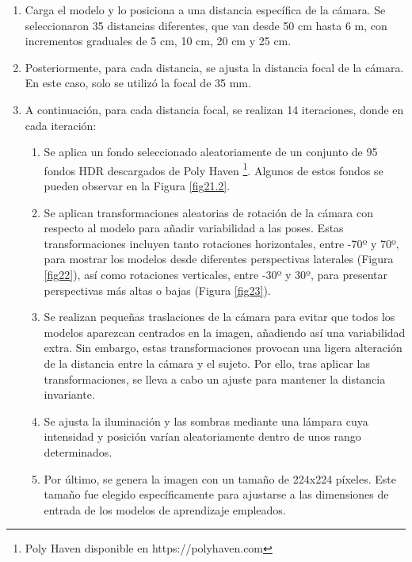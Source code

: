 \begin{enumerate}
	\item Carga el modelo y lo posiciona a una distancia específica de la cámara. Se seleccionaron 35 distancias diferentes, que van desde 50 cm hasta 6 m, con incrementos graduales de 5 cm, 10 cm, 20 cm y 25 cm.
	\item Posteriormente, para cada distancia, se ajusta la distancia focal de la cámara. En este caso, solo se utilizó la focal de 35 mm.
	\item A continuación, para cada distancia focal, se realizan 14 iteraciones, donde en cada iteración:
	\begin{enumerate}
		\item Se aplica un fondo seleccionado aleatoriamente de un conjunto de 95 fondos HDR descargados de Poly Haven \footnote{Poly Haven disponible en https://polyhaven.com}. Algunos de estos fondos se pueden observar en la Figura \ref{fig21.2}.
		\item Se aplican transformaciones aleatorias de rotación de la cámara con respecto al modelo para añadir variabilidad a las poses. Estas transformaciones incluyen tanto rotaciones horizontales, entre -70º y 70º, para mostrar los modelos desde diferentes perspectivas laterales (Figura \ref{fig22}), así como rotaciones verticales, entre -30º y 30º, para presentar perspectivas más altas o bajas (Figura \ref{fig23}).
		\item Se realizan pequeñas traslaciones de la cámara para evitar que todos los modelos aparezcan centrados en la imagen, añadiendo así una variabilidad extra. Sin embargo, estas transformaciones provocan una ligera alteración de la distancia entre la cámara y el sujeto. Por ello, tras aplicar las transformaciones, se lleva a cabo un ajuste para mantener la distancia invariante.
		\item Se ajusta la iluminación y las sombras mediante una lámpara cuya intensidad y posición varían aleatoriamente dentro de unos rango determinados.
		\item Por último, se genera la imagen con un tamaño de 224x224 píxeles. Este tamaño fue elegido específicamente para ajustarse a las dimensiones de entrada de los modelos de aprendizaje empleados.
	\end{enumerate}
\end{enumerate}



